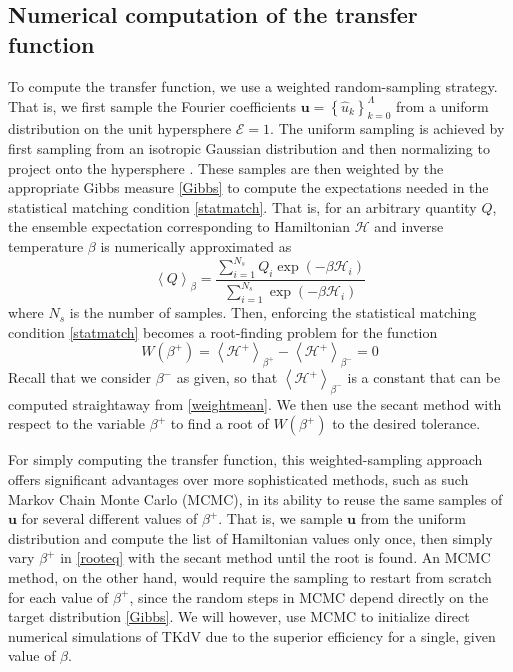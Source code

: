 \documentclass[11pt]{article}
\newcommand{\mean}[1]{\left< #1 \right>}
\newcommand{\En}{\mathcal{E}}
\newcommand{\uhat}{\hat{u}}
\newcommand{\Ham}{\mathcal{H}}
\newcommand{\Hdn}{\Ham^{+}}
\newcommand{\invtemp}{\beta}
\newcommand{\itup}{\invtemp^{-}}
\newcommand{\itdn}{\invtemp^{+}}
\newcommand{\Nsamp}{N_s}
\newcommand{\sumsamp}{\sum_{i=1}^{\Nsamp}}
\newcommand{\Fth}{W}
\newcommand{\uhvec}{\mathbf{u}}
\begin{document}
\subsection{Numerical computation of the transfer function}

	To compute the transfer function, we use a weighted random-sampling strategy. That is, we first sample the Fourier coefficients $\uhvec = \left\{ \uhat_{k}\right\}_{k=0}^{\Lambda}$ from a uniform distribution on the unit hypersphere $\En = 1$. The uniform sampling is achieved by first sampling from an isotropic Gaussian distribution and then normalizing to project onto the hypersphere \cite{abramov2003}. These samples are then weighted by the appropriate Gibbs measure \eqref{Gibbs} to compute the expectations needed in the statistical matching condition \eqref{statmatch}. That is, for an arbitrary quantity $Q$, the ensemble expectation corresponding to Hamiltonian $\Ham$ and inverse temperature $\invtemp$ is numerically approximated as
\begin{equation}
\label{weightmean}
\mean{Q}_{\invtemp} = \frac{\sumsamp Q_i \exp(-\invtemp \Ham_i)} {\sumsamp \exp(-\invtemp \Ham_i)}
\end{equation}
where $\Nsamp$ is the number of samples. Then, enforcing the statistical matching condition \eqref{statmatch} becomes a root-finding problem for the function
\begin{equation}
\label{rooteq}
\Fth(\itdn) =  \mean{\Hdn}_{\itdn} - \mean{\Hdn}_{\itup} = 0
\end{equation}
Recall that we consider $\itup$ as given, so that $\mean{\Hdn}_{\itup}$ is a constant that can be computed straightaway from \eqref{weightmean}. We then use the secant method with respect to the variable $\itdn$ to find a root of $\Fth(\itdn)$ to the desired tolerance.

For simply computing the transfer function, this weighted-sampling approach offers significant advantages over more sophisticated methods, such as such Markov Chain Monte Carlo (MCMC), in its ability to reuse the same samples of $\uhvec$ for several different values of $\itdn$. That is, we sample $\uhvec$ from the uniform distribution and compute the list of Hamiltonian values only once, then simply vary $\itdn$ in \eqref{rooteq} with the secant method until the root is found. An MCMC method, on the other hand, would require the sampling to restart from scratch for each value of $\itdn$, since the random steps in MCMC depend directly on the target distribution \eqref{Gibbs}. We will however, use MCMC to initialize direct numerical simulations of TKdV due to the superior efficiency for a single, given value of $\invtemp$.
\end{document}
